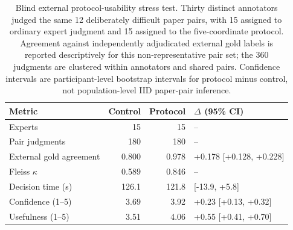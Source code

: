\documentclass[11pt]{article}
\begin{document}
\begin{table}[t]
\centering
\scriptsize
\setlength{\tabcolsep}{3pt}
\begin{tabularx}{\linewidth}{lrr>{\raggedright\arraybackslash}X}
\toprule
\textbf{Metric} & \textbf{Control} & \textbf{Protocol} & \textbf{$\Delta$ (95\% CI)} \\
\midrule
Experts & 15 & 15 & -- \\
Pair judgments & 180 & 180 & -- \\
External gold agreement & 0.800 & 0.978 & +0.178 [+0.128, +0.228] \\
Fleiss $\kappa$ & 0.589 & 0.846 & -- \\
Decision time (s) & 126.1 & 121.8 & -4.3 [-13.9, +5.8] \\
Confidence (1--5) & 3.69 & 3.92 & +0.23 [+0.13, +0.32] \\
Usefulness (1--5) & 3.51 & 4.06 & +0.55 [+0.41, +0.70] \\
\bottomrule
\end{tabularx}
\caption{Blind external protocol-usability stress test. Thirty distinct annotators judged the same 12 deliberately difficult paper pairs, with 15 assigned to ordinary expert judgment and 15 assigned to the five-coordinate protocol. Agreement against independently adjudicated external gold labels is reported descriptively for this non-representative pair set; the 360 judgments are clustered within annotators and shared pairs. Confidence intervals are participant-level bootstrap intervals for protocol minus control, not population-level IID paper-pair inference.}
\label{tab:expert-validation-pilot}
\end{table}

\end{document}

